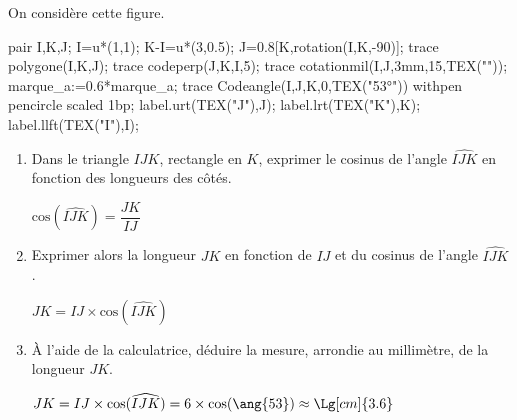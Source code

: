 \begin{corrige}
    On considère cette figure.

    \begin{Geometrie}
        pair I,K,J;
        I=u*(1,1);
        K-I=u*(3,0.5);
        J=0.8[K,rotation(I,K,-90)];
        trace polygone(I,K,J);
        trace codeperp(J,K,I,5);
        trace cotationmil(I,J,3mm,15,TEX(""));
        marque_a:=0.6*marque_a;                
        trace Codeangle(I,J,K,0,TEX("\ang{53}")) withpen pencircle scaled 1bp;
        label.urt(TEX("J"),J);
        label.lrt(TEX("K"),K);
        label.llft(TEX("I"),I);
    \end{Geometrie}

    \begin{enumerate}
        \item Dans le triangle $IJK$, rectangle en $K$, exprimer le cosinus de l'angle $\widehat{IJK}$ en fonction des longueurs des côtés.
        
        {\color{red} $\text{cos}(\widehat{IJK})=\dfrac{JK}{IJ}$}
        \item Exprimer alors la longueur $JK$ en fonction de $IJ$ et du cosinus de l'angle $\widehat{IJK}$.
        
        {\color{red} $JK=IJ\times \text{cos}(\widehat{IJK})$}
        \item À l'aide de la calculatrice, déduire la mesure, arrondie au millimètre, de la longueur $JK$.
        
        {\color{red} $JK=IJ\times \text{cos}(\widehat{IJK})=6\times \text{cos}(\ang{53})\approx\Lg[cm]{3.6}$}
    \end{enumerate}
\end{corrige}

